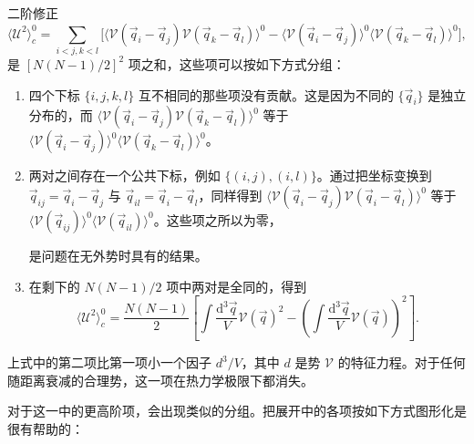 二阶修正
\begin{equation}\label{eq:5.10}
\big\langle\mathcal U^2\big\rangle_c^0=\sum_{i<j,k<l}\Big[\big\langle\mathscr V(\vec q_i-\vec q_j)\mathscr V(\vec q_k-\vec q_l)\big\rangle^0-\big\langle\mathscr V(\vec q_i-\vec q_j)\big\rangle^0\big\langle\mathscr V(\vec q_k-\vec q_l)\big\rangle^0\Big],
\end{equation}
是 $[N(N-1)/2]^2$ 项之和，这些项可以按如下方式分组：

\begin{enumerate}[label=(\roman*)]
\item 四个下标 $\{i,j,k,l\}$ 互不相同的那些项没有贡献。这是因为不同的 $\{\vec q_i\}$ 是独立分布的，而 $\langle\mathscr V(\vec q_i-\vec q_j)\mathscr V(\vec q_k-\vec q_l)\rangle^0$ 等于 $\langle\mathscr V(\vec q_i-\vec q_j)\rangle^0\langle\mathscr V(\vec q_k-\vec q_l)\rangle^0$。

\item 两对之间存在一个公共下标，例如 $\{(i,j),(i,l)\}$。通过把坐标变换到 $\vec q_{ij}=\vec q_i-\vec q_j$ 与 $\vec q_{il}=\vec q_i-\vec q_l$，同样得到 $\langle\mathscr V(\vec q_i-\vec q_j)\mathscr V(\vec q_i-\vec q_l)\rangle^0$ 等于 $\langle\mathscr V(\vec q_{ij})\rangle^0\langle\mathscr V(\vec q_{il})\rangle^0$。这些项之所以为零，


是问题在无外势时具有的结果。

\item 在剩下的 $N(N-1)/2$ 项中两对是全同的，得到
\begin{equation}\label{eq:5.11}
\big\langle\mathcal U^2\big\rangle_c^0=\frac{N(N-1)}{2}\left[\int\frac{\mathrm{d}^3\vec q}{V}\mathscr V(\vec q)^2-\left(\int\frac{\mathrm{d}^3\vec q}{V}\mathscr V(\vec q)\right)^2\right].
\end{equation}
\end{enumerate}

上式中的第二项比第一项小一个因子 $d^3/V$，其中 $d$ 是势 $\mathscr V$ 的特征力程。对于任何随距离衰减的合理势，这一项在热力学极限下都消失。

对于这一中的更高阶项，会出现类似的分组。把展开中的各项按如下方式图形化是很有帮助的：


